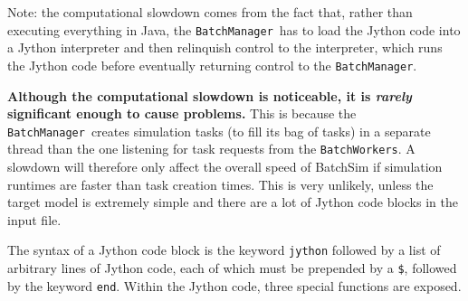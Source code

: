 \documentclass{article}
\newcommand{\BM}{{\tt BatchManager}}
\newcommand{\BWs}{{\tt BatchWorkers}}
\begin{document}
\begin{sideblock}
Note: the computational slowdown comes from the fact that, rather than executing everything in Java, the \BM\ has to load the Jython code into a Jython interpreter and then relinquish control to the interpreter, which runs the Jython code before eventually returning control to the \BM.

\textbf{Although the computational slowdown is noticeable, it is \textit{rarely} significant enough to cause problems.} This is because the \BM\ creates simulation tasks (to fill its bag of tasks) in a separate thread than the one listening for task requests from the \BWs. A slowdown will therefore only affect the overall speed of BatchSim if simulation runtimes are faster than task creation times. This is very unlikely, unless the target model is extremely simple and there are a lot of Jython code blocks in the input file.
\end{sideblock}

The syntax of a Jython code block is the keyword {\tt jython} followed by a list of arbitrary lines of Jython code, each of which must be prepended by a {\tt \$}, followed by the keyword {\tt end}. Within the Jython code, three special functions are exposed.
\end{document}
